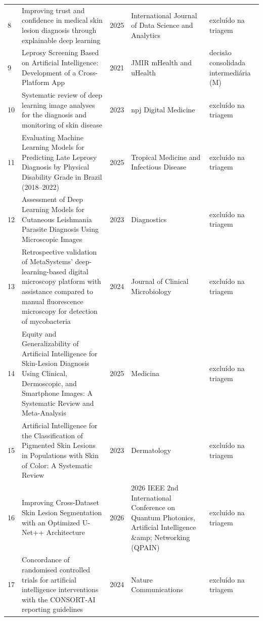 \begin{longtable}{@{}lp{6.4cm}lp{3.1cm}p{3.2cm}@{}}
\hypertarget{estudo:8}{8} & Improving trust and confidence in medical skin lesion diagnosis through explainable deep learning & 2025 & International Journal of Data Science and Analytics & exclu\'ido na triagem \\
\hypertarget{estudo:9}{9} & Leprosy Screening Based on Artificial Intelligence: Development of a Cross-Platform App & 2021 & JMIR mHealth and uHealth & decis\~ao consolidada intermedi\'aria (M) \\
\hypertarget{estudo:10}{10} & Systematic review of deep learning image analyses for the diagnosis and monitoring of skin disease & 2023 & npj Digital Medicine & exclu\'ido na triagem \\
\hypertarget{estudo:11}{11} & Evaluating Machine Learning Models for Predicting Late Leprosy Diagnosis by Physical Disability Grade in Brazil (2018--2022) & 2025 & Tropical Medicine and Infectious Disease & exclu\'ido na triagem \\
\hypertarget{estudo:12}{12} & Assessment of Deep Learning Models for Cutaneous Leishmania Parasite Diagnosis Using Microscopic Images & 2023 & Diagnostics & exclu\'ido na triagem \\
\hypertarget{estudo:13}{13} & Retrospective validation of MetaSystems' deep-learning-based digital microscopy platform with assistance compared to manual fluorescence microscopy for detection of mycobacteria & 2024 & Journal of Clinical Microbiology & exclu\'ido na triagem \\
\hypertarget{estudo:14}{14} & Equity and Generalizability of Artificial Intelligence for Skin-Lesion Diagnosis Using Clinical, Dermoscopic, and Smartphone Images: A Systematic Review and Meta-Analysis & 2025 & Medicina & exclu\'ido na triagem \\
\hypertarget{estudo:15}{15} & Artificial Intelligence for the Classification of Pigmented Skin Lesions in Populations with Skin of Color: A Systematic Review & 2023 & Dermatology & exclu\'ido na triagem \\
\hypertarget{estudo:16}{16} & Improving Cross-Dataset Skin Lesion Segmentation with an Optimized U-Net++ Architecture & 2026 & 2026 IEEE 2nd International Conference on Quantum Photonics, Artificial Intelligence \&amp; Networking (QPAIN) & exclu\'ido na triagem \\
\hypertarget{estudo:17}{17} & Concordance of randomised controlled trials for artificial intelligence interventions with the CONSORT-AI reporting guidelines & 2024 & Nature Communications & exclu\'ido na triagem \\

\end{longtable}
